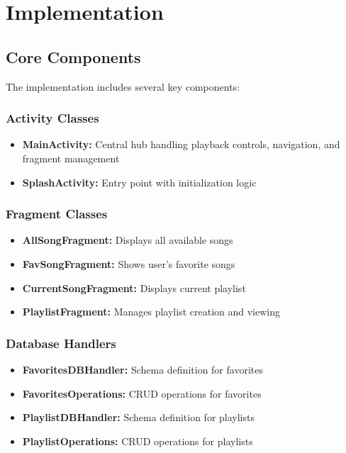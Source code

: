 \documentclass{article}
\begin{document}
\section{Implementation}
\subsection{Core Components}
The implementation includes several key components:

\subsubsection{Activity Classes}
\begin{itemize}
    \item \textbf{MainActivity:} Central hub handling playback controls, navigation, and fragment management
    \item \textbf{SplashActivity:} Entry point with initialization logic
\end{itemize}

\subsubsection{Fragment Classes}
\begin{itemize}
    \item \textbf{AllSongFragment:} Displays all available songs
    \item \textbf{FavSongFragment:} Shows user's favorite songs
    \item \textbf{CurrentSongFragment:} Displays current playlist
    \item \textbf{PlaylistFragment:} Manages playlist creation and viewing
\end{itemize}

\subsubsection{Database Handlers}
\begin{itemize}
    \item \textbf{FavoritesDBHandler:} Schema definition for favorites
    \item \textbf{FavoritesOperations:} CRUD operations for favorites
    \item \textbf{PlaylistDBHandler:} Schema definition for playlists
    \item \textbf{PlaylistOperations:} CRUD operations for playlists
\end{itemize}
\end{document}
